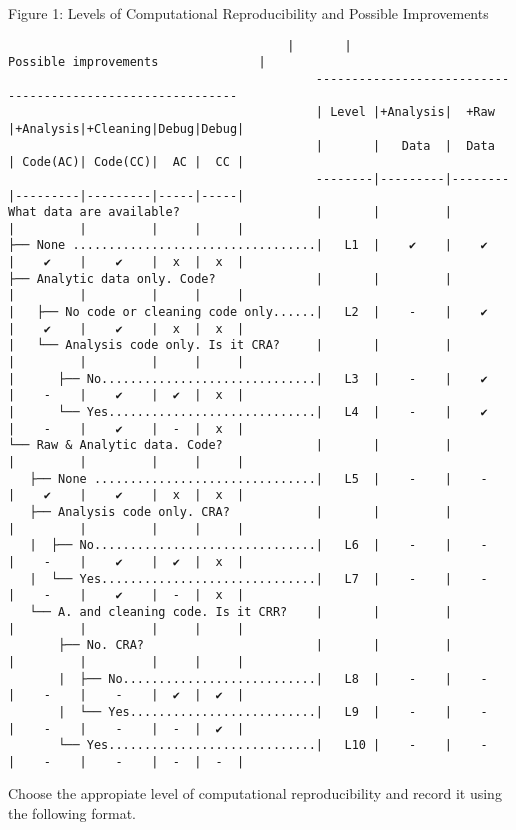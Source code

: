 \documentclass[]{book}
\begin{document}
Figure 1: Levels of Computational Reproducibility and Possible Improvements

\begin{verbatim}
                                       |       |               Possible improvements              |
                                           -----------------------------------------------------------
                                           | Level |+Analysis|  +Raw  |+Analysis|+Cleaning|Debug|Debug|
                                           |       |   Data  |  Data  | Code(AC)| Code(CC)|  AC |  CC |
                                           --------|---------|--------|---------|---------|-----|-----|
What data are available?                   |       |         |        |         |         |     |     |
├── None ..................................|   L1  |    ✔    |    ✔   |    ✔    |    ✔    |  x  |  x  |
├── Analytic data only. Code?              |       |         |        |         |         |     |     |
|   ├── No code or cleaning code only......|   L2  |    -    |    ✔   |    ✔    |    ✔    |  x  |  x  |
|   └── Analysis code only. Is it CRA?     |       |         |        |         |         |     |     |
|      ├── No..............................|   L3  |    -    |    ✔   |    -    |    ✔    |  ✔  |  x  |
|      └── Yes.............................|   L4  |    -    |    ✔   |    -    |    ✔    |  -  |  x  |
└── Raw & Analytic data. Code?             |       |         |        |         |         |     |     |
   ├── None ...............................|   L5  |    -    |    -   |    ✔    |    ✔    |  x  |  x  |
   ├── Analysis code only. CRA?            |       |         |        |         |         |     |     |
   |  ├── No...............................|   L6  |    -    |    -   |    -    |    ✔    |  ✔  |  x  |
   |  └── Yes..............................|   L7  |    -    |    -   |    -    |    ✔    |  -  |  x  |
   └── A. and cleaning code. Is it CRR?    |       |         |        |         |         |     |     |
       ├── No. CRA?                        |       |         |        |         |         |     |     |
       |  ├── No...........................|   L8  |    -    |    -   |    -    |    -    |  ✔  |  ✔  |
       |  └── Yes..........................|   L9  |    -    |    -   |    -    |    -    |  -  |  ✔  |
       └── Yes.............................|   L10 |    -    |    -   |    -    |    -    |  -  |  -  |
\end{verbatim}

Choose the appropiate level of computational reproducibility and record it using the following format.
\end{document}
